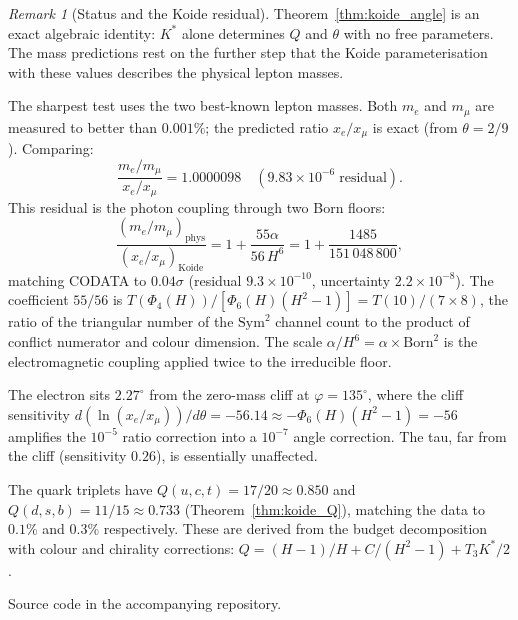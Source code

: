 \documentclass[11pt,a4paper]{article}
\theoremstyle{definition}
\theoremstyle{remark}
\newtheorem{remark}[theorem]{Remark}
\begin{document}
\begin{remark}[Status and the Koide residual]\label{rem:koide_status}
Theorem~\ref{thm:koide_angle} is an exact algebraic identity: $K^*$ alone determines $Q$ and $\theta$ with no free parameters. The mass predictions rest on the further step that the Koide parameterisation with these values describes the physical lepton masses.

The sharpest test uses the two best-known lepton masses. Both $m_e$ and $m_\mu$ are measured to better than $0.001\%$; the predicted ratio $x_e/x_\mu$ is exact (from $\theta=2/9$). Comparing:
\[
\frac{m_e/m_\mu}{x_e/x_\mu} = 1.0000098 \quad (9.83\times 10^{-6}\;\mathrm{residual}).
\]
This residual is the photon coupling through two Born floors:
\begin{equation}\label{eq:koide_residual}
\frac{(m_e/m_\mu)_{\mathrm{phys}}}{(x_e/x_\mu)_{\mathrm{Koide}}} = 1 + \frac{55\alpha}{56\,H^6} = 1 + \frac{1485}{151\,048\,800},
\end{equation}
matching CODATA to $0.04\sigma$ (residual $9.3\times 10^{-10}$, uncertainty $2.2\times 10^{-8}$). The coefficient $55/56$ is $T(\Phi_4(H))/[\Phi_6(H)(H^2\!-\!1)]=T(10)/(7\times 8)$, the ratio of the triangular number of the $\mathrm{Sym}^2$ channel count to the product of conflict numerator and colour dimension. The scale $\alpha/H^6=\alpha\times\mathrm{Born}^2$ is the electromagnetic coupling applied twice to the irreducible floor.

The electron sits $2.27^\circ$ from the zero-mass cliff at $\varphi=135^\circ$, where the cliff sensitivity $d(\ln(x_e/x_\mu))/d\theta=-56.14\approx-\Phi_6(H)(H^2\!-\!1)=-56$ amplifies the $10^{-5}$ ratio correction into a $10^{-7}$ angle correction. The tau, far from the cliff (sensitivity $0.26$), is essentially unaffected.

The quark triplets have $Q(u,c,t)=17/20\approx 0.850$ and $Q(d,s,b)=11/15\approx 0.733$ (Theorem~\ref{thm:koide_Q}), matching the data to $0.1\%$ and $0.3\%$ respectively. These are derived from the budget decomposition with colour and chirality corrections: $Q=(H-1)/H+C/(H^2-1)+T_3 K^*/2$.

Source code in the accompanying repository.
\end{remark}
\end{document}
